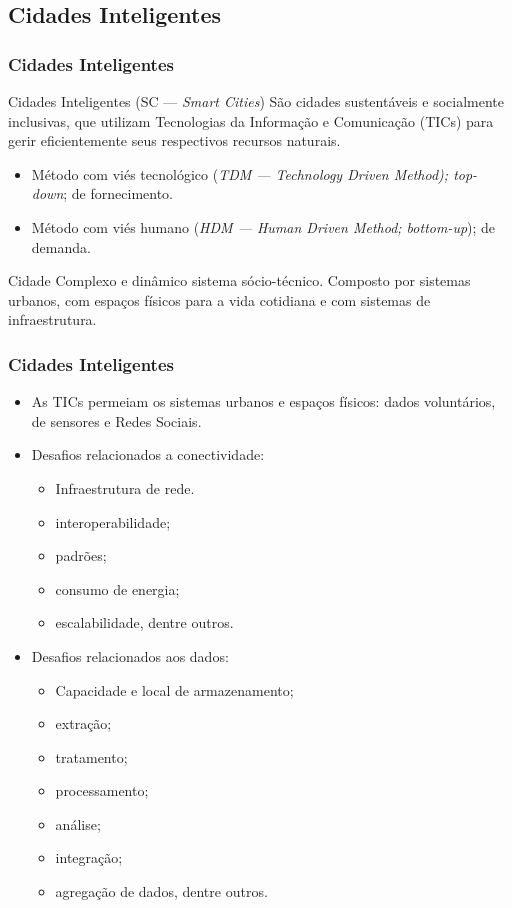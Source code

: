 \documentclass{beamer}
\begin{document}
\subsection{Cidades Inteligentes}
\begin{frame}
\frametitle{Cidades Inteligentes}
\begin{block}{Cidades Inteligentes (SC --- \textit{Smart Cities})}
São cidades sustentáveis e socialmente inclusivas, que utilizam Tecnologias da Informação e Comunicação (TICs) para gerir eficientemente seus respectivos recursos naturais.
\begin{itemize}
\item Método com viés tecnológico (\textit{TDM --- Technology Driven Method); top-down}; de fornecimento.
\item Método com viés humano (\textit{HDM --- Human Driven Method; bottom-up}); de demanda.
\end{itemize}
\end{block}

\begin{block}{Cidade}
Complexo e dinâmico sistema sócio-técnico. Composto por sistemas urbanos, com espaços físicos para a vida cotidiana e com sistemas de infraestrutura.
\end{block}
\end{frame}
\begin{frame}
\frametitle{Cidades Inteligentes}
\begin{itemize}
\item As TICs permeiam os sistemas urbanos e espaços físicos: dados voluntários, de sensores e Redes Sociais.
\item Desafios relacionados a conectividade:
\begin{itemize}
\item Infraestrutura de rede.
\item interoperabilidade;
\item padrões;
\item consumo de energia;
\item escalabilidade, dentre outros.
\end{itemize}
\item Desafios relacionados aos dados:
\begin{itemize}
\item Capacidade e local de armazenamento;
\item extração;
\item tratamento;
\item processamento;
\item análise;
\item integração;
\item agregação de dados, dentre outros.
\end{itemize}
\end{itemize}
\end{frame}
\end{document}
